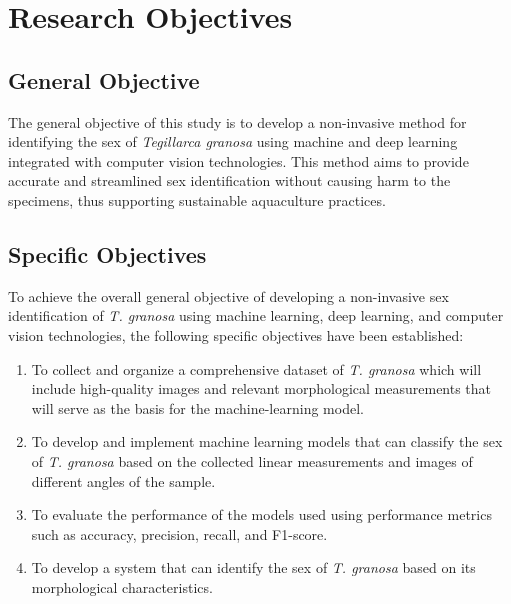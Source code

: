 \section{Research Objectives}
\label{sec:researchobjectives}

\subsection{General Objective}
\label{sec:generalobjective}

The general objective of this study is to develop a non-invasive method for identifying the sex of \textit{Tegillarca granosa} using machine and deep learning integrated with computer vision technologies. This method aims to provide accurate and streamlined sex identification without causing harm to the specimens, thus supporting sustainable aquaculture practices.

\subsection{Specific Objectives}
\label{sec:specificobjectives}

To achieve the overall general objective of developing a non-invasive sex identification of \textit{T. granosa} using machine learning, deep learning, and computer vision technologies, the following specific objectives have been established:  

\begin{enumerate}
   \item To collect and organize a comprehensive dataset of \textit{T. granosa} which will include high-quality images and relevant morphological measurements that will serve as the basis for the machine-learning model.
 
   \item To develop and implement machine learning models that can classify the sex of \textit{T. granosa} based on the collected linear measurements and images of different angles of the sample.
   
   \item To evaluate the performance of the models used using performance metrics such as accuracy, precision, recall, and F1-score. 
   
   \item To develop a system that can identify the sex of \textit{T. granosa} based on its morphological characteristics. 
\end{enumerate}



